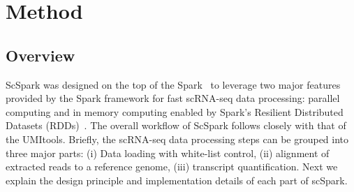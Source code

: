 \documentclass[conference]{IEEEtran}
\begin{document}
\fi


\section{Method}
\subsection{Overview}
ScSpark was designed on the top of the Spark~\cite{zaharia2010spark} to leverage two major features provided by the Spark framework for fast scRNA-seq data processing: parallel computing and in memory computing enabled by Spark's Resilient Distributed Datasets (RDDs)~\cite{Zaharia2012Resilient}. 
The overall workflow of ScSpark follows closely with that of the UMI\-tools.
Briefly, the scRNA-seq data processing steps can be grouped into three major parts: (i) Data loading with white-list control, (ii) alignment of extracted reads to a reference genome, (iii) transcript quantification.
Next we explain the design principle and implementation details of each part of scSpark. 



\end{document}
